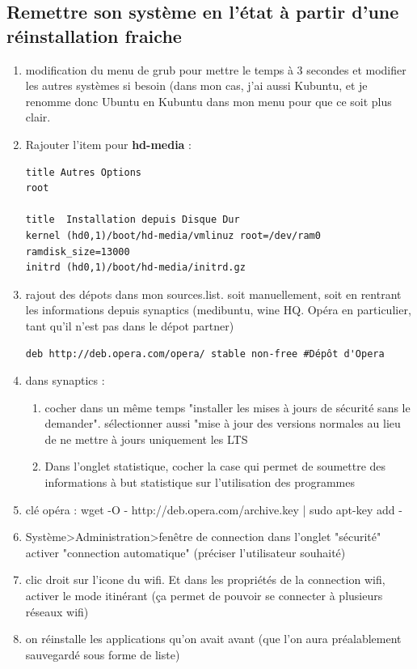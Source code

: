 \documentclass[a4paper,twoside]{article}
\begin{document}
\subsection{Remettre son système en l'état à partir d'une réinstallation fraiche}
\begin{enumerate}
\item modification du menu de grub pour mettre le temps à 3 secondes et modifier les autres systèmes si besoin (dans mon cas, j'ai aussi Kubuntu, et je renomme donc Ubuntu en Kubuntu dans mon menu pour que ce soit plus clair.
\item Rajouter l'item pour \textbf{hd-media} :
\begin{verbatim}
title Autres Options
root

title  Installation depuis Disque Dur
kernel (hd0,1)/boot/hd-media/vmlinuz root=/dev/ram0 ramdisk_size=13000
initrd (hd0,1)/boot/hd-media/initrd.gz
\end{verbatim}

\item rajout des dépots dans mon sources.list. soit manuellement, soit en rentrant les informations depuis synaptics (medibuntu, wine HQ. Opéra en particulier, tant qu'il n'est pas dans le dépot partner)
\begin{verbatim}
deb http://deb.opera.com/opera/ stable non-free #Dépôt d'Opera
\end{verbatim}
\item dans synaptics :
\begin{enumerate}
\item cocher dans un même temps "installer les mises à jours de sécurité sans le demander". sélectionner aussi "mise à jour des versions normales au lieu de ne mettre à jours uniquement les LTS
\item Dans l'onglet statistique, cocher la case qui permet de soumettre des informations à but statistique sur l'utilisation des programmes
\end{enumerate}
\item clé opéra : wget -O - http://deb.opera.com/archive.key | sudo apt-key add -
\item Système>Administration>fenêtre de connection dans l'onglet "sécurité" activer "connection automatique" (préciser l'utilisateur souhaité)
\item clic droit sur l'icone du wifi. Et dans les propriétés de la connection wifi, activer le mode itinérant (ça permet de pouvoir se connecter à plusieurs réseaux wifi)
\item on réinstalle les applications qu'on avait avant (que l'on aura préalablement sauvegardé sous forme de liste)


\end{enumerate}
\end{document}
